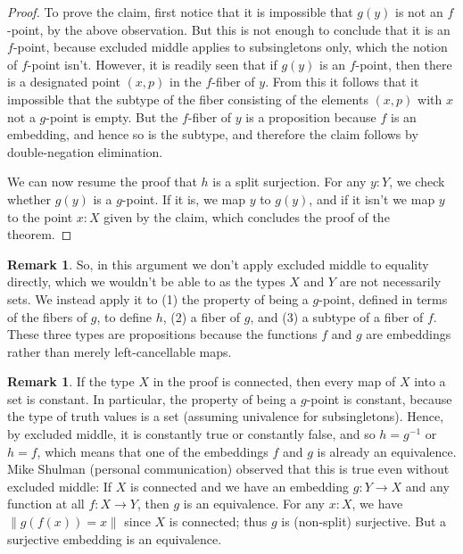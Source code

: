 \documentclass{article}
\theoremstyle{definition}
\newtheorem{remark}[theorem]{Remark}
\begin{document}
\begin{proof}
To prove the claim, first notice that it is impossible that $g(y)$ is not an $f$-point, by the above observation. But this is not enough to conclude that it is an $f$-point, because excluded middle applies to subsingletons only, which the notion of $f$-point isn't. However, it is readily seen that if $g(y)$ is an $f$-point, then there is a designated point $(x,p)$ in the $f$-fiber of $y$. From this it follows that it impossible that the subtype of the fiber consisting of the elements $(x,p)$ with $x$ not a $g$-point is empty. But the $f$-fiber of $y$ is a proposition because $f$ is an embedding, and hence so is the subtype, and therefore the claim follows by double-negation elimination.

We can now resume the proof that $h$ is a split surjection. For any $y:Y$, we check whether $g(y)$ is a $g$-point. If it is, we map $y$ to $g(y)$, and if it isn't we map $y$ to the point $x : X$ given by the claim, which concludes the proof of the theorem.
\end{proof}

\begin{remark} \label{main:remark} So, in this argument we don't apply
  excluded middle to equality directly, which we wouldn't be able to
  as the types $X$ and $Y$ are not necessarily sets. We instead apply
  it to (1) the property of being a $g$-point, defined in terms of the
  fibers of $g$, to define $h$, (2) a fiber of $g$, and (3) a subtype
  of a fiber of $f$. These three types are propositions because the
  functions $f$ and $g$ are embeddings rather than merely
  left-cancellable maps.
\end{remark}

\begin{remark}
  If the type $X$ in the proof is connected, then every map of $X$
  into a set is constant. In particular, the property of being a
  $g$-point is constant, because the type of truth values is a set
  (assuming univalence for subsingletons). Hence, by excluded middle,
  it is constantly true or constantly false, and so $h=g^{-1}$ or
  $h = f$, which means that one of the embeddings $f$ and $g$ is
  already an equivalence.  Mike Shulman (personal communication)
  observed that this is true even without excluded middle: If $X$ is
  connected and we have an embedding $g : Y \to X$ and any function at
  all $f : X \to Y$, then $g$ is an equivalence. For any $x:X$, we
  have $\left\lVert g(f(x)) = x \right\rVert$ since $X$ is connected;
  thus $g$ is (non-split) surjective. But a surjective embedding is an
  equivalence.
\end{remark}





\vfill

\end{document}
